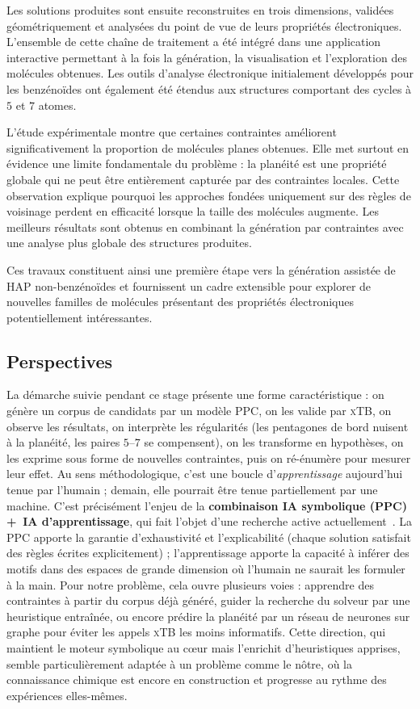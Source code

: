 \documentclass[11pt,a4paper]{article}
\newcommand{\xtb}{\textsc{xTB}}
\begin{document}
Les solutions produites sont ensuite reconstruites en trois dimensions,
validées géométriquement et analysées du point de vue de leurs propriétés
électroniques. L'ensemble de cette chaîne de traitement a été intégré dans une
application interactive permettant à la fois la génération, la visualisation et
l'exploration des molécules obtenues. Les outils d'analyse électronique
initialement développés pour les benzénoïdes ont également été étendus aux
structures comportant des cycles à $5$ et $7$ atomes.

L'étude expérimentale montre que certaines contraintes améliorent
significativement la proportion de molécules planes obtenues. Elle met surtout
en évidence une limite fondamentale du problème : la planéité est une propriété
globale qui ne peut être entièrement capturée par des contraintes locales.
Cette observation explique pourquoi les approches fondées uniquement sur des
règles de voisinage perdent en efficacité lorsque la taille des molécules
augmente. Les meilleurs résultats sont obtenus en combinant la génération par
contraintes avec une analyse plus globale des structures produites.

Ces travaux constituent ainsi une première étape vers la génération assistée
de HAP non-benzénoïdes et fournissent un cadre extensible pour explorer de
nouvelles familles de molécules présentant des propriétés électroniques
potentiellement intéressantes.


\subsection{Perspectives}

La démarche suivie pendant ce stage présente une forme caractéristique : on
génère un corpus de candidats par un modèle PPC, on les valide par \xtb{}, on
observe les résultats, on interprète les régularités (les pentagones de bord
nuisent à la planéité, les paires $5$--$7$ se compensent), on les transforme
en hypothèses, on les exprime sous forme de nouvelles contraintes, puis on
ré-énumère pour mesurer leur effet. Au sens méthodologique, c'est une boucle
d'\emph{apprentissage} aujourd'hui tenue par l'humain ; demain, elle pourrait
être tenue partiellement par une machine. C'est précisément l'enjeu de la
\textbf{combinaison IA symbolique (PPC) \,+\, IA d'apprentissage}, qui fait
l'objet d'une recherche active actuellement~\cite{cappart2023,bengio2021}.
La PPC apporte la
garantie d'exhaustivité et l'explicabilité (chaque solution satisfait des
règles écrites explicitement) ; l'apprentissage apporte la capacité à inférer
des motifs dans des espaces de grande dimension où l'humain ne saurait les
formuler à la main. Pour notre problème, cela ouvre plusieurs voies :
apprendre des contraintes à partir du corpus déjà généré, guider la recherche
du solveur par une heuristique entraînée, ou encore prédire la planéité par
un réseau de neurones sur graphe pour éviter les appels \xtb{} les moins
informatifs. Cette direction, qui maintient le moteur symbolique au cœur
mais l'enrichit d'heuristiques apprises, semble particulièrement adaptée à un
problème comme le nôtre, où la connaissance chimique est encore en
construction et progresse au rythme des expériences elles-mêmes.
\end{document}
